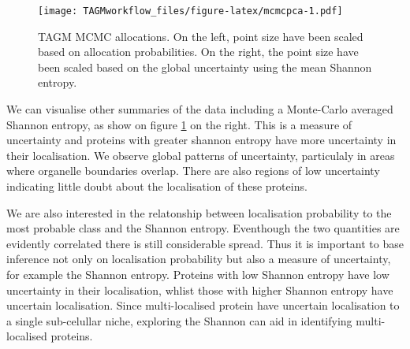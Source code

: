 \documentclass[]{article}
\newenvironment{Shaded}{\begin{snugshade}}{\end{snugshade}}
\newcommand{\KeywordTok}[1]{\textcolor[rgb]{0.13,0.29,0.53}{\textbf{{#1}}}}
\newcommand{\DataTypeTok}[1]{\textcolor[rgb]{0.13,0.29,0.53}{{#1}}}
\newcommand{\DecValTok}[1]{\textcolor[rgb]{0.00,0.00,0.81}{{#1}}}
\newcommand{\FloatTok}[1]{\textcolor[rgb]{0.00,0.00,0.81}{{#1}}}
\newcommand{\StringTok}[1]{\textcolor[rgb]{0.31,0.60,0.02}{{#1}}}
\newcommand{\NormalTok}[1]{{#1}}
\begin{document}
\begin{Shaded}
\end{Shaded}

\begin{figure}[htbp]
\centering
\texttt{[image: TAGMworkflow\_files/figure-latex/mcmcpca-1.pdf]}
\caption{\label{fig:mcmcpca}TAGM MCMC allocations. On the left, point size
have been scaled based on allocation probabilities. On the right, the
point size have been scaled based on the global uncertainty using the
mean Shannon entropy.}
\end{figure}

We can visualise other summaries of the data including a Monte-Carlo
averaged Shannon entropy, as show on figure \ref{fig:mcmcpca} on the
right. This is a measure of uncertainty and proteins with greater
shannon entropy have more uncertainty in their localisation. We observe
global patterns of uncertainty, particulaly in areas where organelle
boundaries overlap. There are also regions of low uncertainty indicating
little doubt about the localisation of these proteins.

We are also interested in the relatonship between localisation
probability to the most probable class and the Shannon entropy.
Eventhough the two quantities are evidently correlated there is still
considerable spread. Thus it is important to base inference not only on
localisation probability but also a measure of uncertainty, for example
the Shannon entropy. Proteins with low Shannon entropy have low
uncertainty in their localisation, whlist those with higher Shannon
entropy have uncertain localisation. Since multi-localised protein have
uncertain localisation to a single sub-celullar niche, exploring the
Shannon can aid in identifying multi-localised proteins.
\end{document}
